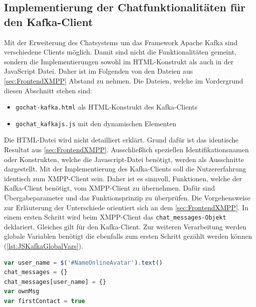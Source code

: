 \documentclass[a4paper,titlepage,halfparskip,12pt]{scrreprt}
\begin{document}
\begin{onehalfspacing}
\section{Implementierung der Chatfunktionalitäten für den Kafka-Client}
\label{HTML_JS_KafkaClient}
Mit der Erweiterung des Chatsystems um das Framework Apache Kafka sind verschiedene Clients möglich. Damit sind nicht die Funktionalitäten gemeint, sondern die Implementierungen sowohl im HTML-Konstrukt als auch in der JavaScript Datei. Daher ist im Folgenden von den Dateien aus \autoref{sec:FrontendXMPP} Abstand zu nehmen. Die Dateien, welche im Vordergrund diesen Abschnitt stehen sind:
\begin{itemize}
	\item \texttt{gochat-kafka.html} als HTML-Konstrukt des Kafka-Clients
	\item \texttt{gochat\_kafkajs.js} mit den dynamischen Elementen
\end{itemize}
Die \acs{HTML}-Datei wird nicht detailliert erklärt. Grund dafür ist das identische Resultat aus \autoref{sec:FrontendXMPP}. Ausschließlich speziellen Identifikationsnamen oder Konstrukten, welche die Javascript-Datei benötigt, werden als Ausschnitte dargestellt. Mit der Implementierung des Kafka-Clients soll die Nutzererfahrung identisch zum XMPP-Client sein. Daher ist es sinnvoll, Funktionen, welche der Kafka-Client benötigt, vom XMPP-Client zu übernehmen. Dafür sind Übergabeparameter und das Funktionsprinzip zu überprüfen. Die Vorgehensweise zur Erläuterung der Unterschiede orientiert sich an dem \autoref{sec:FrontendXMPP}. In einem ersten Schritt wird beim XMPP-Client das \texttt{chat\_messages-Objekt} deklariert. Gleiches gilt für den Kafka-Client. Zur weiteren Verarbeitung werden globale Variablen benötigt die ebenfalls zum ersten Schritt gezählt werden können (\autoref{lst:JSKafkaGlobalVars}).
\begin{lstlisting}[language=Javascript,caption=Globale Variablendekleration ,label={lst:JSKafkaGlobalVars}]
var user_name = $('#NameOnlineAvatar').text()
chat_messages = {}
chat_messages[user_name] = {}
var ownMsg
var firstContact = true
\end{lstlisting}

\end{onehalfspacing}
\end{document}
